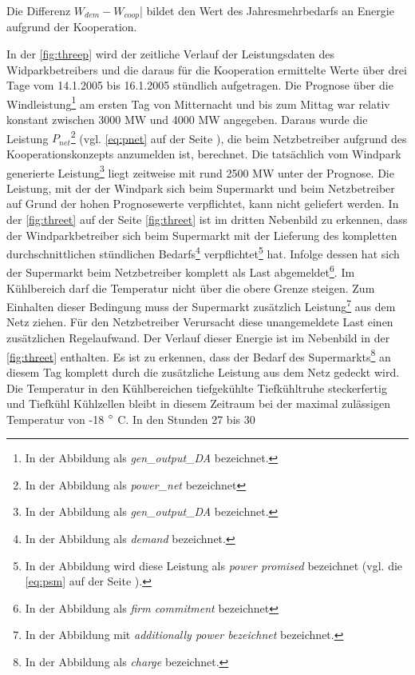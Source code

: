 Die Differenz $W_{dem}- W_{coop}$| bildet den Wert des Jahresmehrbedarfs an
Energie aufgrund der Kooperation.

In der \cref{fig:threep} wird der zeitliche Verlauf der Leistungsdaten des
Widparkbetreibers und die daraus f\"ur die Kooperation ermittelte Werte \"uber
drei Tage vom 14.1.2005 bis 16.1.2005 st\"undlich aufgetragen. Die Prognose
\"uber die Windleistung\footnote{ In der Abbildung als \textit{gen\_output\_DA}
bezeichnet.} am ersten Tag von Mitternacht und bis zum Mittag war relativ
konstant zwischen 3000 MW und 4000 MW angegeben. Daraus wurde die Leistung
$P_{net}$\footnote{ In der Abbildung als \textit{power\_net} bezeichnet} (vgl.
\cref{eq:pnet} auf der Seite \pageref{eq:pnet}), die beim Netzbetreiber aufgrund
des Kooperationskonzepts anzumelden ist, berechnet. Die tats\"achlich vom
Windpark generierte Leistung\footnote{ In der Abbildung als
\textit{gen\_output\_DA} bezeichnet.} liegt zeitweise mit rund 2500 MW unter der
Prognose. Die Leistung, mit der der Windpark sich beim Supermarkt und beim
Netzbetreiber auf Grund der hohen Prognosewerte verpflichtet, kann nicht
geliefert werden. In der \cref{fig:threet} auf der Seite \cref{fig:threet} ist
im dritten Nebenbild zu erkennen, dass der
Windparkbetreiber sich beim Supermarkt mit der Lieferung des kompletten
durchschnittlichen st\"undlichen Bedarfs\footnote{ In der Abbildung als
\textit{demand} bezeichnet.} verpflichtet\footnote{ In der Abbildung wird diese
Leistung als \textit{power promised} bezeichnet (vgl. die \cref{eq:psm} auf der
Seite \pageref{eq:psm}).} hat. Infolge dessen hat sich der Supermarkt beim
Netzbetreiber komplett als Last abgemeldet\footnote{ In der Abbildung als
\textit{firm commitment} bezeichnet}. Im K\"uhlbereich darf die Temperatur
nicht \"uber die obere Grenze steigen. Zum Einhalten dieser Bedingung muss der
Supermarkt zus\"atzlich Leistung\footnote{ In der Abbildung mit
\textit{additionally power bezeichnet} bezeichnet.} aus dem Netz ziehen. F\"ur
den Netzbetreiber Verursacht diese unangemeldete Last einen zus\"atzlichen
Regelaufwand. Der Verlauf dieser Energie ist im Nebenbild in der
\cref{fig:threet} enthalten. Es ist zu erkennen, dass der Bedarf des
Supermarkts\footnote{ In der Abbildung als \textit{charge} bezeichnet.}
an diesem Tag komplett durch die zus\"atzliche Leistung aus dem Netz gedeckt
wird. Die Temperatur in den K\"uhlbereichen tiefgek\"uhlte Tiefk\"uhltruhe
steckerfertig und Tiefk\"uhl K\"uhlzellen bleibt in diesem Zeitraum bei der
maximal zul\"assigen Temperatur von -18 $^\circ$ C. In den Stunden 27 bis 30
